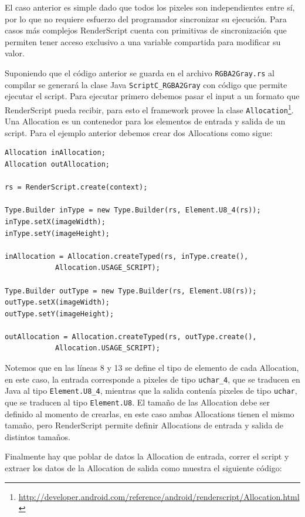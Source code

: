 El caso anterior es simple dado que todos los pixeles son independientes entre sí, por lo que no requiere esfuerzo del programador sincronizar su ejecución. Para casos más complejos RenderScript cuenta con primitivas de sincronización que permiten tener acceso exclusivo a una variable compartida para modificar su valor.

Suponiendo que el código anterior se guarda en el archivo \texttt{RGBA2Gray.rs} al compilar se generará la clase Java
\texttt{ScriptC\_RGBA2Gray} con código que permite ejecutar el script. Para ejecutar primero debemos pasar el input a un formato que RenderScript pueda recibir, para esto el framework provee la clase \texttt{Allocation}\footnote{\url{http://developer.android.com/reference/android/renderscript/Allocation.html}}. Una Allocation es un contenedor para los elementos de entrada y salida de un script. Para el ejemplo anterior debemos crear dos Allocations como sigue:

\begin{lstlisting}[style=JavaInputStyle]
Allocation inAllocation;
Allocation outAllocation;

rs = RenderScript.create(context);

Type.Builder inType = new Type.Builder(rs, Element.U8_4(rs));
inType.setX(imageWidth);
inType.setY(imageHeight);

inAllocation = Allocation.createTyped(rs, inType.create(),
            Allocation.USAGE_SCRIPT);

Type.Builder outType = new Type.Builder(rs, Element.U8(rs));
outType.setX(imageWidth);
outType.setY(imageHeight);

outAllocation = Allocation.createTyped(rs, outType.create(),
            Allocation.USAGE_SCRIPT);
\end{lstlisting}

Notemos que en las líneas 8 y 13 se define el tipo de elemento de cada Allocation, en este caso, la entrada corresponde a pixeles de tipo \texttt{uchar\_4}, que se traducen en Java al tipo \texttt{Element.U8\_4}, mientras que la salida contenía pixeles de tipo \texttt{uchar}, que se traducen al tipo \texttt{Element.U8}. El tamaño de las Allocation debe ser definido al momento de crearlas, en este caso ambas Allocations tienen el mismo tamaño, pero RenderScript permite definir Allocations de entrada y salida de distintos tamaños.

Finalmente hay que poblar de datos la Allocation de entrada, correr el script y extraer los datos de la Allocation de salida como muestra el siguiente código:

